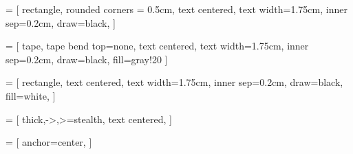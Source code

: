  = [
    rectangle,
    rounded corners = 0.5cm,
    text centered,
    text width=1.75cm,
    inner sep=0.2cm,
    draw=black,
]

 = [
    tape,
    tape bend top=none,
    text centered,
    text width=1.75cm,
    inner sep=0.2cm,
    draw=black,
    fill=gray!20
]


 = [
    rectangle,
    text centered,
    text width=1.75cm,
    inner sep=0.2cm,
    draw=black,
    fill=white,
]

 = [
    thick,->,>=stealth,
    text centered,
]

 = [
    anchor=center,
]

